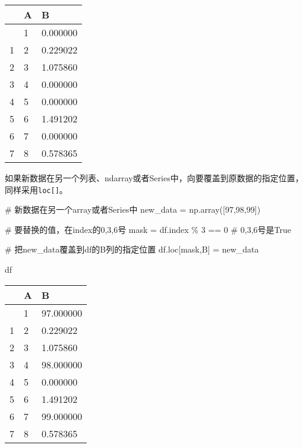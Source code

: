 \documentclass[
  letterpaper,
  DIV=11,
  numbers=noendperiod]{scrreprt}
\newenvironment{Shaded}{\begin{snugshade}}{\end{snugshade}}
\newcommand{\CommentTok}[1]{\textcolor[rgb]{0.37,0.37,0.37}{#1}}
\newcommand{\DecValTok}[1]{\textcolor[rgb]{0.68,0.00,0.00}{#1}}
\newcommand{\NormalTok}[1]{\textcolor[rgb]{0.00,0.23,0.31}{#1}}
\newcommand{\OperatorTok}[1]{\textcolor[rgb]{0.37,0.37,0.37}{#1}}
\newcommand{\StringTok}[1]{\textcolor[rgb]{0.13,0.47,0.30}{#1}}
\begin{document}
\begin{longtable}[]{@{}lll@{}}
\toprule\noalign{}
& A & B \\
\midrule\noalign{}
\endhead
\bottomrule\noalign{}
\endlastfoot
0 & 1 & 0.000000 \\
1 & 2 & 0.229022 \\
2 & 3 & 1.075860 \\
3 & 4 & 0.000000 \\
4 & 5 & 0.000000 \\
5 & 6 & 1.491202 \\
6 & 7 & 0.000000 \\
7 & 8 & 0.578365 \\
\end{longtable}

如果新数据在另一个列表、ndarray或者Series中，向要覆盖到原数据的指定位置，
同样采用\texttt{loc{[}{]}}。

\begin{Shaded}
\begin{Highlighting}[]
\CommentTok{\# 新数据在另一个array或者Series中}
\NormalTok{new\_data }\OperatorTok{=}\NormalTok{ np.array([}\DecValTok{97}\NormalTok{,}\DecValTok{98}\NormalTok{,}\DecValTok{99}\NormalTok{])}


\CommentTok{\# 要替换的值，在index的0,3,6号}
\NormalTok{mask }\OperatorTok{=}\NormalTok{ df.index }\OperatorTok{\%} \DecValTok{3} \OperatorTok{==} \DecValTok{0}
\CommentTok{\# 0,3,6号是True}

\CommentTok{\# 把new\_data覆盖到df的B列的指定位置}
\NormalTok{df.loc[mask,}\StringTok{\textquotesingle{}B\textquotesingle{}}\NormalTok{] }\OperatorTok{=}\NormalTok{ new\_data}

\NormalTok{df}
\end{Highlighting}
\end{Shaded}

\begin{longtable}[]{@{}lll@{}}
\toprule\noalign{}
& A & B \\
\midrule\noalign{}
\endhead
\bottomrule\noalign{}
\endlastfoot
0 & 1 & 97.000000 \\
1 & 2 & 0.229022 \\
2 & 3 & 1.075860 \\
3 & 4 & 98.000000 \\
4 & 5 & 0.000000 \\
5 & 6 & 1.491202 \\
6 & 7 & 99.000000 \\
7 & 8 & 0.578365 \\
\end{longtable}
\end{document}

